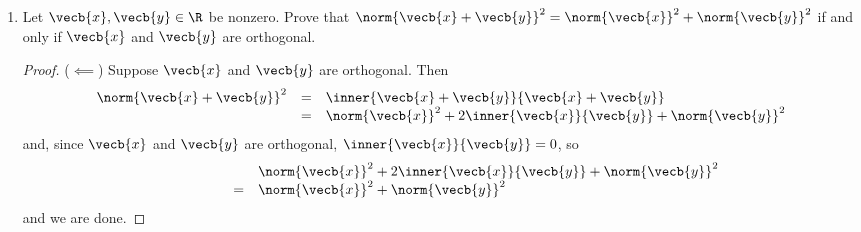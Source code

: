 \documentclass[a5paper]{article}
\theoremstyle{definition}%
\numberwithin{exercise}{section}
\theoremstyle{remark}%
\begin{document}
\begin{enumerate}
\begin{proof}
\[\begin{array}{rcl}
0&=&\norm{\vecb{y}}^2
-2\frac{\inner{\vecb{x}}{\vecb{y}}^2}{\norm{\vecb{x}}^2}
+\frac{\inner{\vecb{x}}{\vecb{y}}^2}{\norm{\vecb{x}}^2}\\

0&=&\norm{\vecb{y}}^2-\frac{\inner{\vecb{x}}{\vecb{y}}^2}{\norm{\vecb{x}}^2}\\
\end{array}\]

From this, we can rearrange to find that $\inner{\vecb{x}}{\vecb{y}}^2=\norm{\vecb{x}}^2\norm{\vecb{y}}^2$ and take square roots, yielding $\abs{\inner{\vecb{x}}{\vecb{y}}}=\norm{\vecb{x}}\norm{\vecb{y}}$ and we are done. 
\end{proof}

\begin{proof}($\implies$) Suppose that $\abs{\inner{\vecb{x}}{\vecb{y}}}=\norm{\vecb{x}}\norm{\vecb{y}}$. 

As in the converse direction (with steps reversed), we can square both sides and rearrange to find that 
$$0=\norm{\vecb{y}}^2
-2\left(\frac{\inner{\vecb{x}}{\vecb{y}}}{\norm{\vecb{x}}^2}\right)\inner{\vecb{x}}{\vecb{y}}
+\left(\frac{\inner{\vecb{x}}{\vecb{y}}}{\norm{\vecb{x}}^2}\right)^2\norm{\vecb{x}}^2.$$
Now since we have assumed that $\vecb{x}\neq\vec{0}$, we know that $\frac{\inner{\vecb{x}}{\vecb{y}}}{\norm{\vecb{x}}^2}$ is a real number. So let $r=\frac{\inner{\vecb{x}}{\vecb{y}}}{\norm{\vecb{x}}^2}$ and substitute to obtain 
$$0=\norm{\vecb{y}}^2-2r\inner{\vecb{x}}{\vecb{y}}+r^2\norm{\vecb{x}}^2.$$
Again as we did in the converse direction, we can rearrange to find that $0=\norm{\vecb{y}-r\vecb{x}}^2$. This means that $\vecb{y}=r\vecb{x}$, and we are done. 
\end{proof} 

\item Let $\vecb{x}, \vecb{y} \in \R$ be nonzero. Prove that $\norm{\vecb{x}+\vecb{y}}^2=\norm{\vecb{x}}^2+\norm{\vecb{y}}^2$ if and only if $\vecb{x}$ and $\vecb{y}$ are orthogonal. 

\begin{proof}($\impliedby$) Suppose $\vecb{x}$ and $\vecb{y}$ are orthogonal. Then 
\[\begin{array}{rcl}
\norm{\vecb{x}+\vecb{y}}^2&=&\inner{\vecb{x}+\vecb{y}}{\vecb{x}+\vecb{y}}\\
&=&\norm{\vecb{x}}^2+2\inner{\vecb{x}}{\vecb{y}}+\norm{\vecb{y}}^2\\
\end{array}\]
and, since $\vecb{x}$ and $\vecb{y}$ are orthogonal, $\inner{\vecb{x}}{\vecb{y}}=0$, so 
\[\begin{array}{rcl}
\quad \quad \quad \quad &&\norm{\vecb{x}}^2+2\inner{\vecb{x}}{\vecb{y}}+\norm{\vecb{y}}^2 \\
&=& \norm{\vecb{x}}^2+\norm{\vecb{y}}^2\\
\end{array}\]
and we are done. 
\end{proof}


\end{enumerate}
\end{document}
